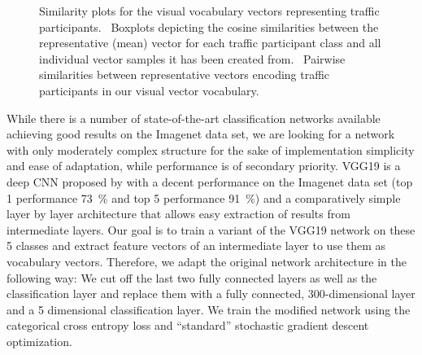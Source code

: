 \begin{figure}[t]
    \centering
    \caption{Similarity plots for the visual vocabulary vectors representing traffic participants.~\protect{} Boxplots depicting the cosine similarities between the representative (mean) vector for each traffic participant class and all individual vector samples it has been created from.~\protect{} Pairwise similarities between representative
    vectors encoding traffic participants in our visual vector vocabulary.}
    \label{fig:visual_vocab_traffic_participants}
    \vspace{-0.6cm}
\end{figure}

While there is a number of state-of-the-art classification networks available achieving good results on the Imagenet data set, we are looking for a network with only moderately complex structure for the sake of implementation simplicity and ease of adaptation, while performance is of secondary priority.
VGG19 is a deep \acf{CNN} proposed by \textcite{Simonyan2014} with a decent performance on the Imagenet data set (top 1 performance \SI{73}{\percent} and top 5 performance \SI{91}{\percent}) and a comparatively simple layer by layer architecture that allows easy extraction of results from intermediate layers.
Our goal is to train a variant of the VGG19 network on these \num{5} classes and extract feature vectors of an intermediate layer to use them as vocabulary vectors.
Therefore, we adapt the original network architecture in the following way:
We cut off the last two fully connected layers as well as the classification layer and replace them with a fully connected, \num{300}-dimensional layer and a \num{5} dimensional classification layer. 
We train the modified network using the categorical cross entropy loss and \enquote{standard} stochastic gradient descent optimization.

